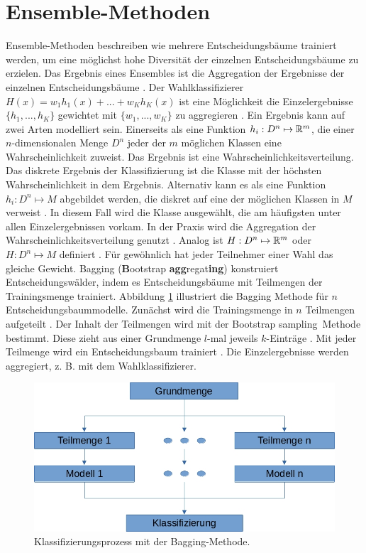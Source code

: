 \section{Ensemble-Methoden}
\label{sec:dt_ensemble_methods}
Ensemble-Methoden beschreiben wie mehrere Entscheidungsbäume trainiert werden, um eine möglichst hohe Diversität der einzelnen Entscheidungsbäume zu erzielen. Das Ergebnis eines Ensembles
ist die Aggregation der Ergebnisse der einzelnen Entscheidungsbäume \cite{dietterich2002ensemble}.
\newline
\newline
Der Wahlklassifizierer $H(x) = w_1 h_1(x) + ... + w_K h_K(x)$ ist eine Möglichkeit die Einzelergebnisse $\{h_1, ..., h_K\}$ gewichtet mit $\{w_1, ..., w_K\}$ zu aggregieren \cite{dietterich2002ensemble}.
Ein Ergebnis kann auf zwei Arten modelliert sein.
Einerseits als eine Funktion $h_i: D^n \mapsto {\mathbb R}^m$, die einer $n$-dimensionalen Menge $D^n$ jeder der $m$ möglichen Klassen eine Wahrscheinlichkeit zuweist.
Das Ergebnis ist eine Wahrscheinlichkeitsverteilung.
Das diskrete Ergebnis der Klassifizierung ist die Klasse mit der höchsten Wahrscheinlichkeit in dem Ergebnis.
Alternativ kann es als eine Funktion $h_i: D^n \mapsto M$ abgebildet werden, die diskret auf eine der möglichen Klassen in $M$ verweist \cite{dymelThesis}.
In diesem Fall wird die Klasse ausgewählt, die am häufigsten unter allen Einzelergebnissen vorkam.
In der Praxis wird die Aggregation der Wahrscheinlichkeitsverteilung genutzt \cite{ScikitLearnEnsemble}.
Analog ist $H: D^n \mapsto {\mathbb R}^m$ oder $H: D^n \mapsto M$ definiert \cite{dietterich2002ensemble}.
Für gewöhnlich hat jeder Teilnehmer einer Wahl das gleiche Gewicht.
\newline
\newline
Bagging (\textbf{B}ootstrap \textbf{agg}regat\textbf{ing}) konstruiert Entscheidungswälder, indem es Entscheidungsbäume mit Teilmengen der Trainingsmenge trainiert.
Abbildung \ref{fig:bagging} illustriert die Bagging Methode für $n$ Entscheidungsbaummodelle. Zunächst wird die Trainingsmenge in $n$ Teilmengen aufgeteilt \cite{breiman1996bagging}.
Der Inhalt der Teilmengen wird mit der \glqq Bootstrap sampling\grqq\ Methode bestimmt. Diese zieht aus einer Grundmenge $l$-mal jeweils $k$-Einträge \cite{efron1992bootstrap}.
Mit jeder Teilmenge wird ein Entscheidungsbaum trainiert \cite{breiman1996bagging}. Die Einzelergebnisse werden aggregiert, z. B. mit dem Wahlklassifizierer.
\begin{figure}[h!]
    \centering
    \includegraphics[width=0.6\linewidth]{images/bagging.jpg}
    \caption{Klassifizierungsprozess mit der Bagging-Methode.}
    \label{fig:bagging}
\end{figure}
